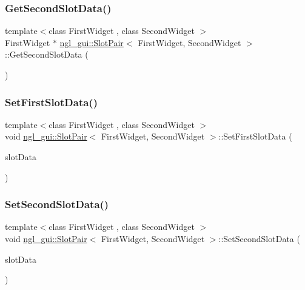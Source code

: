 \subsubsection{\texorpdfstring{Get\+Second\+Slot\+Data()}{GetSecondSlotData()}\hspace{0.1cm}{\footnotesize\ttfamily [2/2]}}
{\footnotesize\ttfamily template$<$class First\+Widget , class Second\+Widget $>$ \\
First\+Widget $\ast$ \mbox{\hyperlink{classngl__gui_1_1_slot_pair}{ngl\+\_\+gui\+::\+Slot\+Pair}}$<$ First\+Widget, Second\+Widget $>$\+::Get\+Second\+Slot\+Data (\begin{DoxyParamCaption}{ }\end{DoxyParamCaption})}

\mbox{\label{classngl__gui_1_1_slot_pair_a478861c7f2deabdf0d7dcb00b421e0f4}} 
\subsubsection{\texorpdfstring{Set\+First\+Slot\+Data()}{SetFirstSlotData()}}
{\footnotesize\ttfamily template$<$class First\+Widget , class Second\+Widget $>$ \\
void \mbox{\hyperlink{classngl__gui_1_1_slot_pair}{ngl\+\_\+gui\+::\+Slot\+Pair}}$<$ First\+Widget, Second\+Widget $>$\+::Set\+First\+Slot\+Data (\begin{DoxyParamCaption}\item[{First\+Widget $\ast$}]{slot\+Data }\end{DoxyParamCaption})}

\mbox{\label{classngl__gui_1_1_slot_pair_aa9df61a55cf75ff986576fabf2ad17ef}} 
\subsubsection{\texorpdfstring{Set\+Second\+Slot\+Data()}{SetSecondSlotData()}}
{\footnotesize\ttfamily template$<$class First\+Widget , class Second\+Widget $>$ \\
void \mbox{\hyperlink{classngl__gui_1_1_slot_pair}{ngl\+\_\+gui\+::\+Slot\+Pair}}$<$ First\+Widget, Second\+Widget $>$\+::Set\+Second\+Slot\+Data (\begin{DoxyParamCaption}\item[{First\+Widget $\ast$}]{slot\+Data }\end{DoxyParamCaption})}



